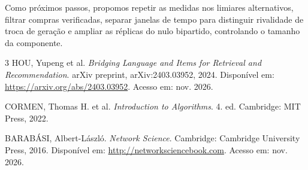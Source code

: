 \documentclass[sigconf,nonacm]{webmedia}
\begin{document}
Como próximos passos, propomos repetir as medidas nos limiares
alternativos, filtrar compras verificadas, separar janelas de tempo
para distinguir rivalidade de troca de geração e ampliar as réplicas
do nulo bipartido, controlando o tamanho da componente.

\begin{thebibliography}{3}
 HOU, Yupeng et al. \emph{Bridging Language and Items for
Retrieval and Recommendation}. arXiv preprint, arXiv:2403.03952, 2024.
Disponível em: \url{https://arxiv.org/abs/2403.03952}. Acesso em: nov. 2026.

 CORMEN, Thomas H. et al. \emph{Introduction to
Algorithms}. 4. ed. Cambridge: MIT Press, 2022.

 BARABÁSI, Albert-László. \emph{Network Science}.
Cambridge: Cambridge University Press, 2016. Disponível em:
\url{http://networksciencebook.com}. Acesso em: nov. 2026.
\end{thebibliography}
\end{document}
